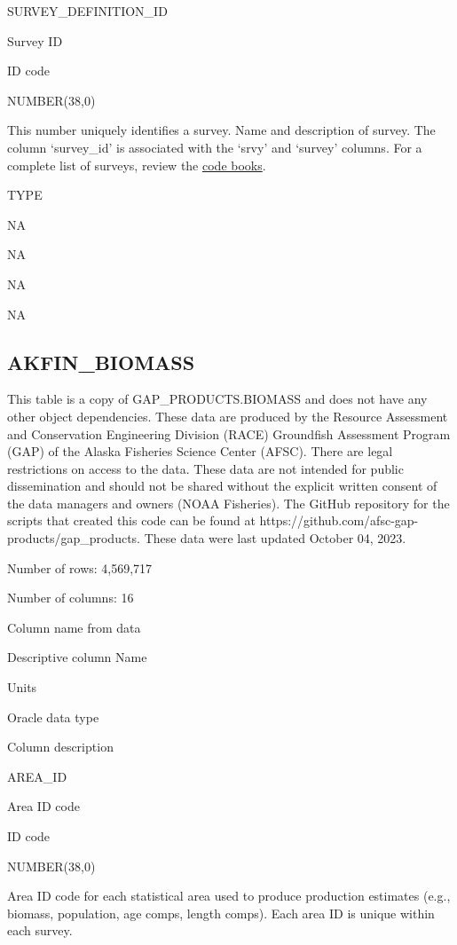 \documentclass[
  letterpaper,
  oneside,
  open=any]{scrbook}
\begin{document}
SURVEY\_DEFINITION\_ID

Survey ID

ID code

NUMBER(38,0)

This number uniquely identifies a survey. Name and description of
survey. The column `survey\_id' is associated with the `srvy' and
`survey' columns. For a complete list of surveys, review the
\href{https://www.fisheries.noaa.gov/resource/document/groundfish-survey-species-code-manual-and-data-codes-manual}{code
books}.

TYPE

NA

NA

NA

NA

\hypertarget{akfin_biomass}{%
\subsection{AKFIN\_BIOMASS}\label{akfin_biomass}}

This table is a copy of GAP\_PRODUCTS.BIOMASS and does not have any
other object dependencies. These data are produced by the Resource
Assessment and Conservation Engineering Division (RACE) Groundfish
Assessment Program (GAP) of the Alaska Fisheries Science Center (AFSC).
There are legal restrictions on access to the data. These data are not
intended for public dissemination and should not be shared without the
explicit written consent of the data managers and owners (NOAA
Fisheries). The GitHub repository for the scripts that created this code
can be found at https://github.com/afsc-gap-products/gap\_products.
These data were last updated October 04, 2023.

Number of rows: 4,569,717

Number of columns: 16

Column name from data

Descriptive column Name

Units

Oracle data type

Column description

AREA\_ID

Area ID code

ID code

NUMBER(38,0)

Area ID code for each statistical area used to produce production
estimates (e.g., biomass, population, age comps, length comps). Each
area ID is unique within each survey.
\end{document}
